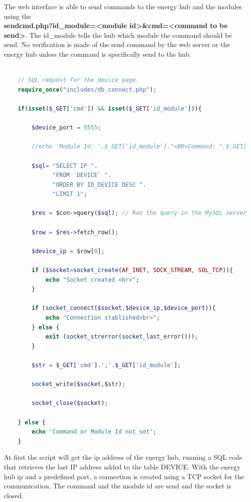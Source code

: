 
The web interface is able to send commands to the energy hub and the modules using the\\ \textbf{sendcmd.php?id\_module=\textless module id\textgreater\&cmd=\textless command to be send\textgreater }. The id\_module tells the hub which module the command should be send.
No verification is made of the send command by the web server or the energy hub unless the command is specifically send to the hub.

\begin{lstlisting}[language=php]

	// SQL request for the device page.
	require_once("includes/db_connect.php");
	
	if(isset($_GET['cmd']) && isset($_GET['id_module'])){
	
		$device_port = 5555;
		
		//echo 'Module Id: '.$_GET['id_module']."<BR>Command: ".$_GET['cmd']."<BR>";
		
		$sql= "SELECT IP ". 
			  "FROM `DEVICE` ". 
			  "ORDER BY ID_DEVICE DESC ".
			  "LIMIT 1";
		
		$res = $con->query($sql); // Run the query in the MySQL server
		
		$row = $res->fetch_row();
		
		$device_ip = $row[0];
		
		if ($socket=socket_create(AF_INET, SOCK_STREAM, SOL_TCP)){
			echo "Socket created <br>";
		}
	
		if (socket_connect($socket,$device_ip,$device_port)){
			echo "Connection stablished<br>";	
		} else {
			exit (socket_strerror(socket_last_error()));
		}
	
		$str = $_GET['cmd'].';'.$_GET['id_module'];
		
		socket_write($socket,$str);
	
		socket_close($socket);
		
	} else {
		echo 'Command or Module Id not set';
	}
\end{lstlisting}

At first the script will get the ip address of the energy hub, running a SQL code that retrieves the last IP address added to the table DEVICE. With the energy hub ip and a predefined port, a connection is created using a TCP socket for the communication. The command and the module id are send and the socket is closed.


